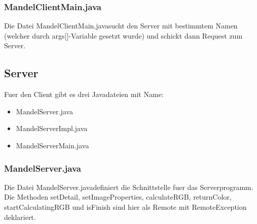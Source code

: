 \documentclass{article}
\begin{document}
	\newpage
	\subsubsection{MandelClientMain.java}
	Die Datei \glqq MandelClientMain.java\grqq sucht den Server mit bestimmtem Namen (welcher durch args[]-Variable gesetzt wurde) und schickt dann Request zum Server.
	

	\newpage
	\subsection{Server}
	Fuer den Client gibt es drei Javadateien mit Name:
	\begin{itemize}
		\item MandelServer.java
		\item MandelServerImpl.java
		\item MandelServerMain.java
	\end{itemize}
	
	\subsubsection{MandelServer.java}
	Die Datei \glqq MandelServer.java\grqq definiert die Schnittstelle fuer das Serverprogramm. Die Methoden setDetail, setImageProperties, calculateRGB, returnColor, startCalculatingRGB und isFinish sind hier als Remote mit RemoteException deklariert.
	
	
	\newpage	
\end{document}
